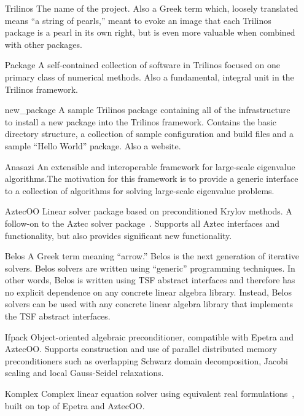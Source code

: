 \begin{itemize}
\item[Trilinos]
The name of the project.  Also a Greek term which,
loosely translated means ``a string of pearls,'' 
meant to evoke an image that each Trilinos package is a pearl in its 
own right, but is even more valuable when combined with other 
packages.

\item[Package]
A self-contained collection of software in Trilinos
focused on one primary class of numerical
methods.  Also a fundamental, integral unit in the Trilinos framework.

\item[new\_package] A sample Trilinos package containing all of the
infrastructure to install a new package into the Trilinos framework.
Contains the basic directory structure, a collection of sample
configuration and build files and a sample ``Hello World'' package.
Also a website.

\item[Anasazi]
An extensible and interoperable framework for large-scale eigenvalue
algorithms.The motivation for this framework is to provide a generic
interface to a collection of algorithms for solving large-scale 
eigenvalue problems.

\item[AztecOO] 
Linear solver package based on preconditioned Krylov methods.  A 
follow-on to the Aztec solver package~\cite{Aztec2.1}.  
Supports all Aztec 
interfaces and functionality, but also provides significant new 
functionality.

\item[Belos] A Greek term meaning ``arrow.'' Belos is the next
generation of iterative solvers.  Belos solvers are written using
``generic'' programming techniques.  In other words, Belos is written
using TSF abstract interfaces and therefore has no explicit dependence
on any concrete linear algebra library.  Instead, Belos solvers can be
used with any concrete linear algebra library that implements the TSF
abstract interfaces. 

\item[Ifpack] 
Object-oriented algebraic preconditioner, compatible with 
Epetra and AztecOO.  Supports construction and use of parallel
distributed memory preconditioners such as overlapping Schwarz domain
decomposition, Jacobi scaling and local Gauss-Seidel relaxations.

\item[Komplex] 
Complex linear equation solver using equivalent real 
formulations~\cite{DayHero2000}, built on top of Epetra and AztecOO.


\end{itemize}
